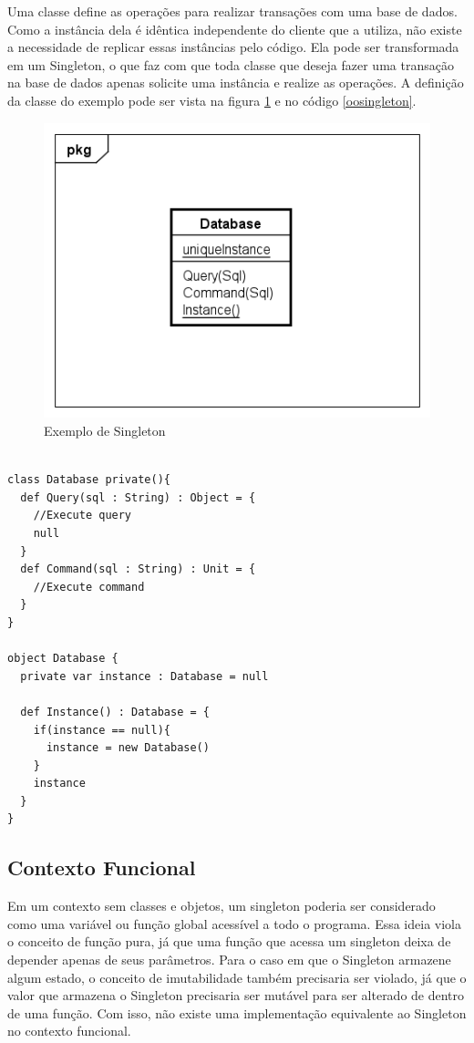 Uma classe define as operações para realizar transações com 
uma base de dados. Como a instância dela é idêntica independente 
do cliente que a utiliza, não existe a necessidade de replicar 
essas instâncias pelo código. Ela pode ser transformada em 
um Singleton, o que faz com que toda classe que deseja fazer 
uma transação na base de dados apenas solicite uma instância 
e realize as operações. A definição da classe do exemplo 
pode ser vista na figura \ref{singleton_exemplo} e no 
código \ref{oosingleton}.

\begin{figure}[htb]
	\caption{\label{singleton_exemplo}Exemplo de Singleton}
	\begin{center}
	    \includegraphics[scale=0.6]{5_padroes-contexto-funcional/5.1_criacionais/5.1.5_singleton/singleton_exemplo.png}
	\end{center}
\end{figure}

\begin{lstlisting}[caption={Singleton Orientação a Objetos},label=oosingleton]

class Database private(){
  def Query(sql : String) : Object = {
    //Execute query
    null
  }
  def Command(sql : String) : Unit = {
    //Execute command
  }
}

object Database {
  private var instance : Database = null

  def Instance() : Database = {
    if(instance == null){
      instance = new Database()
    }
    instance
  }
}

\end{lstlisting}

\subsection*{Contexto Funcional}

Em um contexto sem classes e objetos, 
um singleton poderia ser considerado como 
uma variável ou função global acessível a 
todo o programa. Essa ideia viola o conceito 
de função pura, já que uma função que acessa 
um singleton deixa de depender apenas de seus 
parâmetros. Para o caso em que o Singleton 
armazene algum estado, o conceito de imutabilidade 
também precisaria ser violado, já que o 
valor que armazena o Singleton precisaria ser 
mutável para ser alterado de dentro de uma 
função. Com isso, não existe uma implementação 
equivalente ao Singleton no contexto funcional.